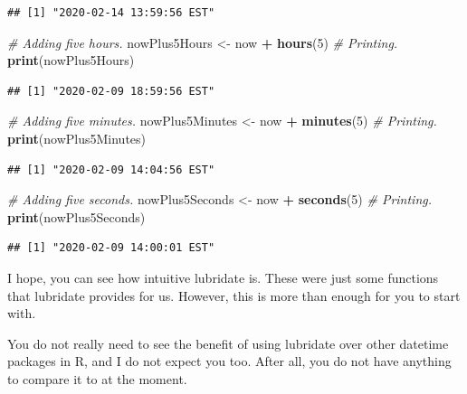 \documentclass[]{book}
\newenvironment{Shaded}{\begin{snugshade}}{\end{snugshade}}
\newcommand{\CommentTok}[1]{\textcolor[rgb]{0.56,0.35,0.01}{\textit{#1}}}
\newcommand{\DecValTok}[1]{\textcolor[rgb]{0.00,0.00,0.81}{#1}}
\newcommand{\KeywordTok}[1]{\textcolor[rgb]{0.13,0.29,0.53}{\textbf{#1}}}
\newcommand{\NormalTok}[1]{#1}
\newcommand{\OperatorTok}[1]{\textcolor[rgb]{0.81,0.36,0.00}{\textbf{#1}}}
\newcommand{\StringTok}[1]{\textcolor[rgb]{0.31,0.60,0.02}{#1}}
\begin{document}
\begin{verbatim}
## [1] "2020-02-14 13:59:56 EST"
\end{verbatim}

\begin{Shaded}
\begin{Highlighting}[]
\CommentTok{# Adding five hours.}
\NormalTok{nowPlus5Hours <-}\StringTok{ }\NormalTok{now }\OperatorTok{+}\StringTok{ }\KeywordTok{hours}\NormalTok{(}\DecValTok{5}\NormalTok{)}
\CommentTok{# Printing.}
\KeywordTok{print}\NormalTok{(nowPlus5Hours)}
\end{Highlighting}
\end{Shaded}

\begin{verbatim}
## [1] "2020-02-09 18:59:56 EST"
\end{verbatim}

\begin{Shaded}
\begin{Highlighting}[]
\CommentTok{# Adding five minutes.}
\NormalTok{nowPlus5Minutes <-}\StringTok{ }\NormalTok{now }\OperatorTok{+}\StringTok{ }\KeywordTok{minutes}\NormalTok{(}\DecValTok{5}\NormalTok{)}
\CommentTok{# Printing.}
\KeywordTok{print}\NormalTok{(nowPlus5Minutes)}
\end{Highlighting}
\end{Shaded}

\begin{verbatim}
## [1] "2020-02-09 14:04:56 EST"
\end{verbatim}

\begin{Shaded}
\begin{Highlighting}[]
\CommentTok{# Adding five seconds.}
\NormalTok{nowPlus5Seconds <-}\StringTok{ }\NormalTok{now }\OperatorTok{+}\StringTok{ }\KeywordTok{seconds}\NormalTok{(}\DecValTok{5}\NormalTok{)}
\CommentTok{# Printing.}
\KeywordTok{print}\NormalTok{(nowPlus5Seconds)}
\end{Highlighting}
\end{Shaded}

\begin{verbatim}
## [1] "2020-02-09 14:00:01 EST"
\end{verbatim}

I hope, you can see how intuitive lubridate is. These were just some functions that lubridate provides for us. However, this is more than enough for you to start with.

You do not really need to see the benefit of using lubridate over other datetime packages in R, and I do not expect you too. After all, you do not have anything to compare it to at the moment.
\end{document}
